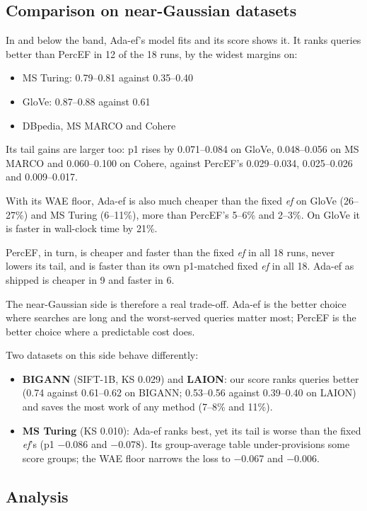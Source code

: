 \documentclass[sigconf,review=false,screen]{acmart}
\newcommand{\ef}{\textit{ef}}
\begin{document}
\subsection{Comparison on near-Gaussian datasets}\label{sec:neargauss}

In and below the band, Ada-ef's model fits and its score shows it. It ranks queries better than
PercEF in 12 of the 18 runs, by the widest margins on:
\begin{itemize}
\item MS Turing: 0.79--0.81 against 0.35--0.40
\item GloVe: 0.87--0.88 against 0.61
\item DBpedia, MS MARCO and Cohere
\end{itemize}
Its tail gains are larger too: p1 rises by 0.071--0.084 on GloVe, 0.048--0.056 on MS MARCO and
0.060--0.100 on Cohere, against PercEF's 0.029--0.034, 0.025--0.026 and 0.009--0.017.

With its WAE floor, Ada-ef is also much cheaper than the fixed \ef{} on GloVe (26--27\%) and MS
Turing (6--11\%), more than PercEF's 5--6\% and 2--3\%. On GloVe it is faster in wall-clock time by
21\%.

PercEF, in turn, is cheaper and faster than the fixed \ef{} in all 18 runs, never lowers its tail,
and is faster than its own p1-matched fixed \ef{} in all 18. Ada-ef as shipped is cheaper in 9 and
faster in 6.

The near-Gaussian side is therefore a real trade-off. Ada-ef is the better choice where searches are
long and the worst-served queries matter most; PercEF is the better choice where a predictable cost
does.

Two datasets on this side behave differently:
\begin{itemize}
\item \textbf{BIGANN} (SIFT-1B, KS 0.029) and \textbf{LAION}: our score ranks queries better
  (0.74 against 0.61--0.62 on BIGANN; 0.53--0.56 against 0.39--0.40 on LAION) and saves the most work
  of any method (7--8\% and 11\%).
\item \textbf{MS Turing} (KS 0.010): Ada-ef ranks best, yet its tail is worse than the fixed \ef{}'s
  (p1 $-$0.086 and $-$0.078). Its group-average table under-provisions some score groups; the WAE
  floor narrows the loss to $-$0.067 and $-$0.006.
\end{itemize}

\subsection{Analysis}\label{sec:analysis}
\end{document}
